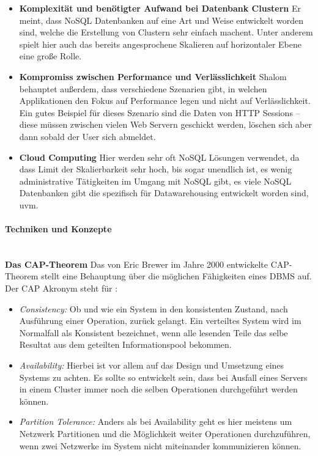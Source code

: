 \begin{itemize}
	\item \textbf{Komplexität und benötigter Aufwand bei Datenbank Clustern}\newline
	 Er meint, dass NoSQL Datenbanken auf eine Art und Weise entwickelt worden sind, welche die Erstellung von Clustern sehr einfach machent. Unter anderem spielt hier auch das bereits angesprochene Skalieren auf horizontaler Ebene eine große Rolle.
	
	\item \textbf{Kompromiss zwischen Performance und Verlässlichkeit}\newline
	 Shalom behauptet außerdem, dass verschiedene Szenarien gibt, in welchen Applikationen den Fokus auf Performance legen und nicht auf Verlässlichkeit. Ein gutes Beispiel für dieses Szenario sind die Daten von HTTP Sessions – diese müssen zwischen vielen Web Servern geschickt werden, löschen sich aber dann sobald der User sich abmeldet.

	\item \textbf{Cloud Computing}\newline
	 Hier werden sehr oft NoSQL Lösungen verwendet, da dass Limit der Skalierbarkeit sehr hoch, bis sogar unendlich ist, es wenig administrative Tätigkeiten im Umgang mit NoSQL gibt, es viele NoSQL Datenbanken gibt die spezifisch für Datawarehousing entwickelt worden sind, uvm.
\end{itemize}

\paragraph{Techniken und Konzepte}\mbox{}\\
\textbf{Das CAP-Theorem\newline}
\label{subsec:captheor}
Das von Eric Brewer im Jahre 2000 entwickelte CAP-Theorem stellt eine Behauptung über die möglichen Fähigkeiten eines DBMS auf. Der CAP Akronym steht für \cite{MELD.CH2-noSQL.capTheorem}:

\begin{itemize}
	\item \textit{Consistency:} Ob und wie ein System in den konsistenten Zustand, nach Ausführung einer Operation, zurück gelangt. Ein verteiltes System wird im Normalfall als Konsistent bezeichnet, wenn alle lesenden Teile das selbe Resultat aus dem geteilten Informationspool bekommen.

	\item \textit{Availability:} Hierbei ist vor allem auf das Design und Umsetzung eines Systems zu achten. Es sollte so entwickelt sein, dass bei Ausfall eines Servers in einem Cluster immer noch die selben Operationen durchgeführt werden können.

	\item \textit{Partition Tolerance:} Anders als bei Availability geht es hier meistens um Netzwerk Partitionen und die Möglichkeit weiter Operationen durchzuführen, wenn zwei Netzwerke im System nicht miteinander kommunizieren können.
\end{itemize}

